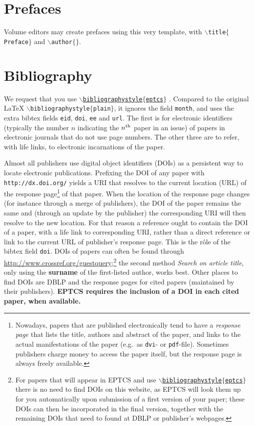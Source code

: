 \documentclass[submission,copyright,creativecommons]{eptcs}
\begin{document}
\section{Prefaces}

Volume editors may create prefaces using this very template,
with {\tt $\backslash$title$\{$Preface$\}$} and {\tt $\backslash$author$\{\}$}.

\section{Bibliography}

We request that you use
\href{http://www.cse.unsw.edu.au/~rvg/EPTCS/eptcs.bst}
{\tt $\backslash$bibliographystyle$\{$eptcs$\}$}
\cite{bibliographystylewebpage}. Compared to the original {\LaTeX}
{\tt $\backslash$biblio\-graphystyle$\{$plain$\}$},
it ignores the field {\tt month}, and uses the extra
bibtex fields {\tt eid}, {\tt doi}, {\tt ee} and {\tt url}.
The first is for electronic identifiers (typically the number $n$
indicating the $n^{\rm th}$ paper in an issue) of papers in electronic
journals that do not use page numbers. The other three are to refer,
with life links, to electronic incarnations of the paper.

Almost all publishers use digital object identifiers (DOIs) as a
persistent way to locate electronic publications. Prefixing the DOI of
any paper with {\tt http://dx.doi.org/} yields a URI that resolves to the
current location (URL) of the response page\footnote{Nowadays, papers
  that are published electronically tend
  to have a \emph{response page} that lists the title, authors and
  abstract of the paper, and links to the actual manifestations of
  the paper (e.g.\ as {\tt dvi}- or {\tt pdf}-file). Sometimes
  publishers charge money to access the paper itself, but the response
  page is always freely available.}
of that paper. When the location of the response page changes (for
instance through a merge of publishers), the DOI of the paper remains
the same and (through an update by the publisher) the corresponding
URI will then resolve to the new location. For that reason a reference
ought to contain the DOI of a paper, with a life link to corresponding
URI, rather than a direct reference or link to the current URL of
publisher's response page. This is the r\^ole of the bibtex field {\tt doi}.
DOIs of papers can often be found through
\url{http://www.crossref.org/guestquery};\footnote{For papers that will appear
  in EPTCS and use \href{http://www.cse.unsw.edu.au/~rvg/EPTCS/eptcs.bst}
  {\tt $\backslash$bibliographystyle$\{$eptcs$\}$} there is no need to
  find DOIs on this website, as EPTCS will look them up for you
  automatically upon submission of a first version of your paper;
  these DOIs can then be incorporated in the final version, together
  with the remaining DOIs that need to found at DBLP or publisher's webpages.}
the second method {\it Search on article title}, only using the {\bf
surname} of the first-listed author, works best.  
Other places to find DOIs are DBLP and the response pages for cited
papers (maintained by their publishers).
{\bf EPTCS requires the inclusion of a DOI in each cited paper, when available.}
\end{document}
